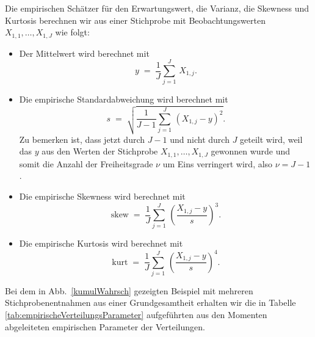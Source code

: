 Die empirischen Schätzer für den Erwartungswert, die Varianz, die Skewness und Kurtosis
berechnen wir aus einer Stichprobe mit Beobachtungswerten $X_{1,1}, \dots, X_{1,J}$
wie folgt:
\begin{itemize}
\item[] Der Mittelwert wird berechnet mit
\begin{equation}
y \; = \; \frac{1}{J}\sum_{j=1}^J \, X_{1,j} .
\end{equation}
\item[] Die empirische Standardabweichung wird berechnet mit
\begin{equation}
s \; = \; \sqrt{ \frac{1}{J-1}\sum_{j=1}^J \, (X_{1,j} - y)^2 }.
\label{empirischeStd}
\end{equation}
Zu bemerken ist, dass jetzt durch $J-1$ und nicht durch $J$ geteilt wird, weil
das $y$ aus den Werten der Stichprobe $X_{1,1}, \dots, X_{1,J}$ gewonnen wurde und somit
die Anzahl der Freiheitsgrade $\nu$ um Eins verringert wird, also $\nu = J-1$.
\item[]
Die empirische Skewness wird berechnet mit
\begin{equation}
\textrm{skew} \; = \; \frac{1}{J} \sum_{j=1}^J \, \left( \frac{X_{1,j} - y}{s} \right)^3 .
\end{equation}
\item[] Die empirische Kurtosis wird berechnet mit
\begin{equation}
\textrm{kurt} \; = \; \frac{1}{J} \sum_{j=1}^J \, \left( \frac{X_{1,j} - y}{s} \right)^4 .
\end{equation}
\end{itemize}
Bei dem in Abb.~\ref{kumulWahrsch} gezeigten Beispiel mit mehreren Stichprobenentnahmen aus
einer Grundgesamtheit erhalten wir die in Tabelle \ref{tab:empirischeVerteilungsParameter} 
aufgeführten aus den Momenten abgeleiteten empirischen Parameter der Verteilungen.

